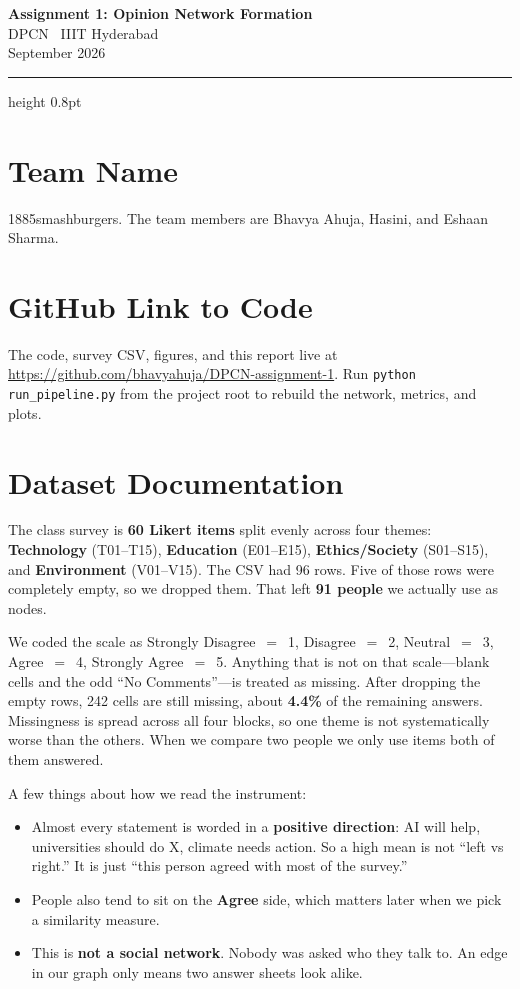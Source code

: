 \documentclass[11pt,a4paper]{article}
\begin{document}
\noindent
{\sffamily\bfseries\LARGE Assignment 1: Opinion Network Formation}\\[0.35em]
{\sffamily\large DPCN \textperiodcentered\ IIIT Hyderabad}\\[0.15em]
{\sffamily\color{muted} September 2026}

\vspace{0.4em}
{\color{rulec}\hrule height 0.8pt}
\vspace{0.9em}

\section{Team Name}

1885smashburgers. The team members are Bhavya Ahuja, Hasini, and Eshaan Sharma.

\section{GitHub Link to Code}

The code, survey CSV, figures, and this report live at
\url{https://github.com/bhavyahuja/DPCN-assignment-1}. Run \texttt{python run\_pipeline.py} from the project root to rebuild the network, metrics, and plots.

\section{Dataset Documentation}

The class survey is \textbf{60 Likert items} split evenly across four themes: \textbf{Technology} (T01--T15), \textbf{Education} (E01--E15), \textbf{Ethics/Society} (S01--S15), and \textbf{Environment} (V01--V15). The CSV had 96 rows. Five of those rows were completely empty, so we dropped them. That left \textbf{91 people} we actually use as nodes.

We coded the scale as Strongly Disagree~$=$~1, Disagree~$=$~2, Neutral~$=$~3, Agree~$=$~4, Strongly Agree~$=$~5. Anything that is not on that scale---blank cells and the odd ``No Comments''---is treated as missing. After dropping the empty rows, 242 cells are still missing, about \textbf{4.4\%} of the remaining answers. Missingness is spread across all four blocks, so one theme is not systematically worse than the others. When we compare two people we only use items both of them answered.

A few things about how we read the instrument:
\begin{itemize}
  \item Almost every statement is worded in a \textbf{positive direction}: AI will help, universities should do X, climate needs action. So a high mean is not ``left vs right.'' It is just ``this person agreed with most of the survey.''
  \item People also tend to sit on the \textbf{Agree} side, which matters later when we pick a similarity measure.
  \item This is \textbf{not a social network}. Nobody was asked who they talk to. An edge in our graph only means two answer sheets look alike.
\end{itemize}
\end{document}
